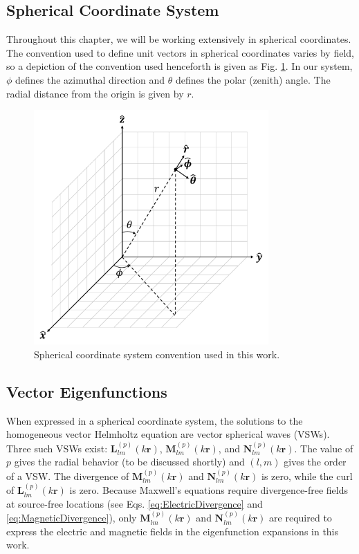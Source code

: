 \subsection{Spherical Coordinate System}
Throughout this chapter, we will be working extensively in spherical coordinates. The convention used to define unit vectors in spherical coordinates varies by field, so a depiction of the convention used henceforth is given as Fig. \ref{fig:SphericalCoordinates}. In our system, $\phi$ defines the azimuthal direction and $\theta$ defines the polar (zenith) angle. The radial distance from the origin is given by $r$.
%
\begin{figure}
\centering
\includegraphics[width=0.8\textwidth]{./Figures/SphericalCoordinates.pdf}
\caption{\label{fig:SphericalCoordinates}Spherical coordinate system convention used in this work.}
\end{figure}

\subsection{Vector Eigenfunctions}
%
When expressed in a spherical coordinate system, the solutions to the homogeneous vector Helmholtz equation are vector spherical waves (VSWs). Three such VSWs exist: $\boldsymbol{L}_{lm}^{(p)}(k\boldsymbol{r})$, $\boldsymbol{M}_{lm}^{(p)}(k\boldsymbol{r})$, and $\boldsymbol{N}_{lm}^{(p)}(k\boldsymbol{r})$. The value of $p$ gives the radial behavior (to be discussed shortly) and $(l,m)$ gives the order of a VSW. The divergence of $\boldsymbol{M}_{lm}^{(p)}(k\boldsymbol{r})$ and $\boldsymbol{N}_{lm}^{(p)}(k\boldsymbol{r})$ is zero, while the curl of $\boldsymbol{L}_{lm}^{(p)}(k\boldsymbol{r})$ is zero. Because Maxwell's equations require divergence-free fields at source-free locations (see Eqs. \ref{eq:ElectricDivergence} and \ref{eq:MagneticDivergence}), only $\boldsymbol{M}_{lm}^{(p)}(k\boldsymbol{r})$ and $\boldsymbol{N}_{lm}^{(p)}(k\boldsymbol{r})$ are required to express the electric and magnetic fields in the eigenfunction expansions in this work.

